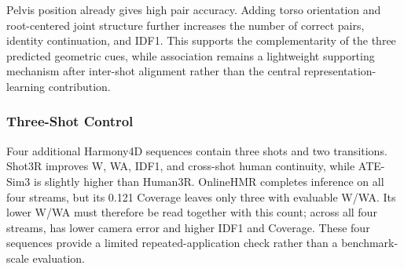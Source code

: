 Pelvis position already gives high pair accuracy. Adding torso orientation and
root-centered joint structure further increases the number of correct pairs,
identity continuation, and IDF1. This supports the complementarity of the
three predicted geometric cues, while association remains a lightweight
supporting mechanism after inter-shot alignment rather than the central
representation-learning contribution.

\subsubsection{Three-Shot Control}
\label{app:multicut}

Four additional Harmony4D sequences contain three shots and two transitions.
Shot3R improves W, WA, IDF1, and cross-shot human continuity, while ATE-Sim3
is slightly higher than Human3R. OnlineHMR completes inference on all four
streams, but its 0.121 Coverage leaves only three with evaluable W/WA. Its
lower W/WA must therefore be read together with this count; across all four
streams, \method{} has lower camera error and higher IDF1 and Coverage.
These four sequences provide a limited repeated-application check rather than
a benchmark-scale evaluation.

\begin{table}[t]
  \centering
  \caption{Harmony4D three-shot results. W/WA are in mm; camera and root
  errors are in m. Parentheses give the number of evaluable sequences;
  Coverage is computed over all four streams.}
  \label{tab:supp-harmony-multicut}
  \supptablesize
  
\end{table}
